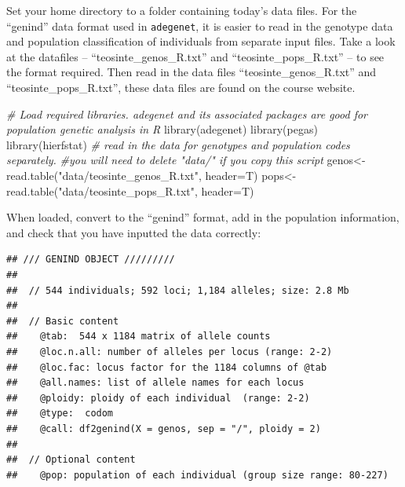 \documentclass[
]{book}
\newenvironment{Shaded}{\begin{snugshade}}{\end{snugshade}}
\newcommand{\AttributeTok}[1]{\textcolor[rgb]{0.77,0.63,0.00}{#1}}
\newcommand{\CommentTok}[1]{\textcolor[rgb]{0.56,0.35,0.01}{\textit{#1}}}
\newcommand{\DecValTok}[1]{\textcolor[rgb]{0.00,0.00,0.81}{#1}}
\newcommand{\FunctionTok}[1]{\textcolor[rgb]{0.00,0.00,0.00}{#1}}
\newcommand{\NormalTok}[1]{#1}
\newcommand{\OtherTok}[1]{\textcolor[rgb]{0.56,0.35,0.01}{#1}}
\newcommand{\SpecialCharTok}[1]{\textcolor[rgb]{0.00,0.00,0.00}{#1}}
\newcommand{\StringTok}[1]{\textcolor[rgb]{0.31,0.60,0.02}{#1}}
\begin{document}
Set your home directory to a folder containing today's data files. For the ``genind'' data format used in \texttt{adegenet}, it is easier to read in the genotype data and population classification of individuals from separate input files. Take a look at the datafiles -- ``teosinte\_genos\_R.txt'' and ``teosinte\_pops\_R.txt'' -- to see the format required. Then read in the data files ``teosinte\_genos\_R.txt'' and ``teosinte\_pops\_R.txt'', these data files are found on the course website.

\begin{Shaded}
\begin{Highlighting}[]
\CommentTok{\# Load required libraries. adegenet and its associated packages are good for population genetic analysis in R}
\FunctionTok{library}\NormalTok{(adegenet)}
\FunctionTok{library}\NormalTok{(pegas)}
\FunctionTok{library}\NormalTok{(hierfstat)}
\CommentTok{\# read in the data for genotypes and population codes separately.}
\CommentTok{\#you will need to delete "data/" if you copy this script}
\NormalTok{genos}\OtherTok{\textless{}{-}}\FunctionTok{read.table}\NormalTok{(}\StringTok{"data/teosinte\_genos\_R.txt"}\NormalTok{, }\AttributeTok{header=}\NormalTok{T)}
\NormalTok{pops}\OtherTok{\textless{}{-}}\FunctionTok{read.table}\NormalTok{(}\StringTok{"data/teosinte\_pops\_R.txt"}\NormalTok{, }\AttributeTok{header=}\NormalTok{T)}
\end{Highlighting}
\end{Shaded}

When loaded, convert to the ``genind'' format, add in the population information, and check that you have inputted the data correctly:

\begin{Shaded}
\end{Shaded}

\begin{verbatim}
## /// GENIND OBJECT /////////
## 
##  // 544 individuals; 592 loci; 1,184 alleles; size: 2.8 Mb
## 
##  // Basic content
##    @tab:  544 x 1184 matrix of allele counts
##    @loc.n.all: number of alleles per locus (range: 2-2)
##    @loc.fac: locus factor for the 1184 columns of @tab
##    @all.names: list of allele names for each locus
##    @ploidy: ploidy of each individual  (range: 2-2)
##    @type:  codom
##    @call: df2genind(X = genos, sep = "/", ploidy = 2)
## 
##  // Optional content
##    @pop: population of each individual (group size range: 80-227)
\end{verbatim}
\end{document}
